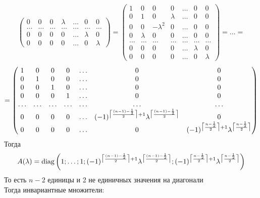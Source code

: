 \begin{gather*}
\begin{pmatrix}
				0 & 0 & 0 & \lambda & \ldots & 0 & 0 \\
				\ldots & \ldots & \ldots & \ldots & \ldots & \ldots & \ldots\\
				0 & 0 & 0 & 0 & \ldots & \lambda & 0 \\
				0 & 0 & 0 & 0 & \ldots & 0 & \lambda
			\end{pmatrix}
			=
			\begin{pmatrix}
				1 & 0 & 0 & 0 & \ldots & 0 & 0 \\
				0 & 1 & 0 & \lambda & \ldots & 0 & 0 \\
				0 & 0 & -\lambda^2 & 0 & \ldots & 0 & 0 \\
				0 & \lambda & 0 & 0 & \ldots & 0 & 0 \\
				\ldots & \ldots & \ldots & \ldots & \ldots & \ldots & \ldots\\
				0 & 0 & 0 & 0 & \ldots & \lambda & 0 \\
				0 & 0 & 0 & 0 & \ldots & 0 & \lambda
			\end{pmatrix}
			=
			\ldots
			=
		\end{gather*}
		\begin{gather*}
			=
			\begin{pmatrix}
			1 & 0 & 0 & 0 & \ldots & 0 & 0 \\
			0 & 1 & 0 & 0 & \ldots & 0 & 0 \\
			0 & 0 & 1 & 0 & \ldots & 0 & 0 \\
			0 & 0 & 0 & 1 & \ldots & 0 & 0 \\
			\ldots & \ldots & \ldots & \ldots & \ldots & \ldots & \ldots\\
			0 & 0 & 0 & 0 & \ldots & (-1)^{\ceil[\big]{\frac{(n-1)-\frac{1}{2}}{2}} + 1}\lambda^{\ceil[\big]{\frac{(n-1)-\frac{1}{2}}{2}}} & 0 \\
			0 & 0 & 0 & 0 & \ldots & 0 & (-1)^{\ceil[\big]{\frac{n-\frac{1}{2}}{2}} + 1}\lambda^{\ceil[\big]{\frac{n-\frac{1}{2}}{2}}}
			\end{pmatrix}
		\end{gather*}
		Тогда 
		\begin{gather*}
			A(\lambda) = 
			\text{diag}\left(
			1;\ldots; 1; 
			(-1)^{\ceil[\big]{\frac{(n-1)-\frac{1}{2}}{2}} + 1}\lambda^{\ceil[\big]{\frac{(n-1)-\frac{1}{2}}{2}}};
			(-1)^{\ceil[\big]{\frac{n-\frac{1}{2}}{2}} + 1}\lambda^{\ceil[\big]{\frac{n-\frac{1}{2}}{2}}}
			\right)
		\end{gather*}
		То есть $n-2$ единицы и 2 не единичных значения на диагонали\\
		Тогда инвариантные множители:

